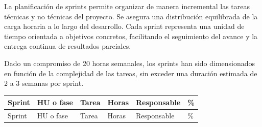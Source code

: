 \documentclass[
11pt, %
]{charter}
\begin{document}
La planificación de sprints permite organizar de manera incremental las tareas técnicas y no técnicas del proyecto. Se asegura una distribución equilibrada de la carga horaria a lo largo del desarrollo. Cada sprint representa una unidad de tiempo orientada a objetivos concretos, facilitando el seguimiento del avance y la entrega continua de resultados parciales.

Dado un compromiso de 20 horas semanales, los sprints han sido dimensionados en función de la complejidad de las tareas, sin exceder una duración estimada de 2 a 3 semanas por sprint.

\begin{longtable}{|l|l|>{\raggedright\arraybackslash}p{5cm}|l|l|l|}
\hline
\rowcolor[HTML]{C0C0C0}
Sprint & HU o fase & Tarea & Horas & Responsable & \% \\ \hline
\endfirsthead

\hline
\rowcolor[HTML]{C0C0C0}
Sprint & HU o fase & Tarea & Horas & Responsable & \% \\ \hline
\endhead


\end{longtable}
\end{document}
